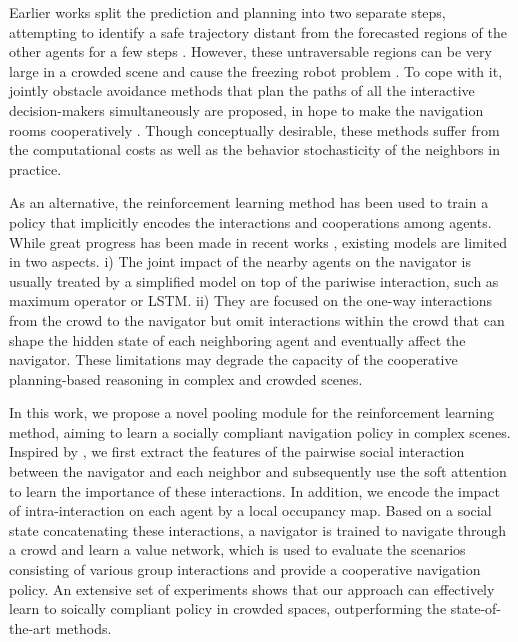 \documentclass[letterpaper, 10 pt, conference]{ieeeconf}  %
\begin{document}
Earlier works split the prediction and planning into two separate steps, attempting to identify a safe trajectory distant from the forecasted regions of the other agents for a few steps \cite{bennewitz_learning_2005,aoude_probabilistically_2013}. However, these untraversable regions can be very large in a crowded scene and cause the freezing robot problem \cite{trautman_unfreezing_2010}. To cope with it, jointly obstacle avoidance methods that plan the paths of all the interactive decision-makers simultaneously are proposed, in hope to make the navigation rooms cooperatively \cite{trautman_unfreezing_2010}. Though conceptually desirable, these methods suffer from the computational costs as well as the behavior stochasticity of the neighbors in practice. 

As an alternative, the reinforcement learning method has been used to train a policy that implicitly encodes the interactions and cooperations among agents. While great progress has been made in recent works \cite{chen_decentralized_2016,chen_socially_2017,long_towards_2017,everett_motion_2018}, existing models are limited in two aspects. i) The joint impact of the nearby agents on the navigator is usually treated by a simplified model on top of the pariwise interaction, such as maximum operator or LSTM. ii) They are focused on the one-way interactions from the crowd to the navigator but omit interactions within the crowd that can shape the hidden state of each neighboring agent and eventually affect the navigator. These limitations may degrade the capacity of the cooperative planning-based reasoning in complex and crowded scenes. 

In this work, we propose a novel pooling module for the reinforcement learning method, aiming to learn a socially compliant navigation policy in complex scenes. Inspired by \cite{alahi_social_2016,gupta_social_2018,vemula_social_2017}, we first extract the features of the pairwise social interaction between the navigator and each neighbor and subsequently use the soft attention to learn the importance of these interactions. In addition, we encode the impact of intra-interaction on each agent by a local occupancy map. Based on a social state concatenating these interactions, a navigator is trained to navigate through a crowd and learn a value network, which is used to evaluate the scenarios consisting of various group interactions and provide a cooperative navigation policy. An extensive set of experiments shows that our approach can effectively learn to soically compliant policy in crowded spaces, outperforming the state-of-the-art methods. 
\end{document}
